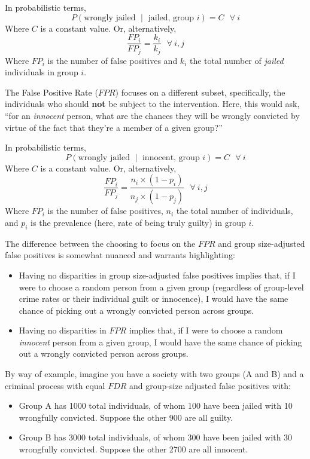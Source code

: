 \documentclass[]{krantz}
\begin{document}
In probabilistic terms,
\[P(\textrm{wrongly jailed $\mid$ jailed, group $i$}) = C~~~\forall~i\]
Where \(C\) is a constant value. Or, alternatively,
\[\frac{FP_i}{FP_j} = \frac{k_i}{k_j}~~~\forall~i,j\] Where \(FP_i\) is
the number of false positives and \(k_i\) the total number of
\emph{jailed} individuals in group \(i\).

The False Positive Rate (\(FPR\)) focuses on a different subset,
specifically, the individuals who should \textbf{not} be subject to the
intervention. Here, this would ask, ``for an \emph{innocent} person,
what are the chances they will be wrongly convicted by virtue of the
fact that they're a member of a given group?''

In probabilistic terms,
\[P(\textrm{wrongly jailed $\mid$ innocent, group $i$}) = C~~~\forall~i\]
Where \(C\) is a constant value. Or, alternatively,
\[\frac{FP_i}{FP_j} = \frac{n_i \times (1-p_i)}{n_j \times (1-p_j)}~~~\forall~i,j\]
Where \(FP_i\) is the number of false positives, \(n_i\) the total
number of individuals, and \(p_i\) is the prevalence (here, rate of
being truly guilty) in group \(i\).

The difference between the choosing to focus on the \(FPR\) and group
size-adjusted false positives is somewhat nuanced and warrants
highlighting:

\begin{itemize}
\item
  Having no disparities in group size-adjusted false positives implies
  that, if I were to choose a random person from a given group
  (regardless of group-level crime rates or their individual guilt or
  innocence), I would have the same chance of picking out a wrongly
  convicted person across groups.
\item
  Having no disparities in \(FPR\) implies that, if I were to choose a
  random \emph{innocent} person from a given group, I would have the
  same chance of picking out a wrongly convicted person across groups.
\end{itemize}

By way of example, imagine you have a society with two groups (A and B)
and a criminal process with equal \(FDR\) and group-size adjusted false
positives with:

\begin{itemize}
\item
  Group A has 1000 total individuals, of whom 100 have been jailed with
  10 wrongfully convicted. Suppose the other 900 are all guilty.
\item
  Group B has 3000 total individuals, of whom 300 have been jailed with
  30 wrongfully convicted. Suppose the other 2700 are all innocent.
\end{itemize}
\end{document}
